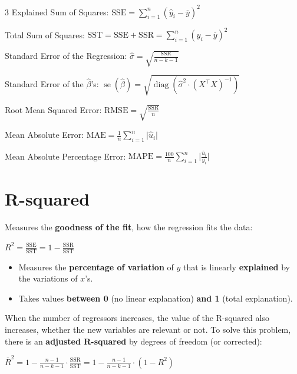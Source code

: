 \documentclass[10pt, a4paper, landscape]{article}
\DeclareMathOperator{\se}{se}
\DeclareMathOperator{\diag}{diag}
\newcommand{\SSR}{\text{SSR}}
\newcommand{\SSE}{\text{SSE}}
\newcommand{\SST}{\text{SST}}
\begin{document}
\begin{multicols}{3}
Explained Sum of Squares: \hfill \( \SSE = \sum_{i = 1}^{n} (\hat{y}_{i} - \overline{y})^{2} \)

Total Sum of Squares: \hfill \( \SST = \SSE + \SSR = \sum_{i = 1}^{n} (y_{i} - \overline{y})^{2} \)

Standard Error of the Regression: \hfill \( \hat{\sigma} = \sqrt{\frac{\SSR}{n - k - 1}} \)

Standard Error of the \( \hat{\beta} \)'s: \hfill \( \se(\hat{\beta}) = \sqrt{ \diag ( \hat{\sigma}^{2} \cdot (X^{\top} X)^{-1} ) } \)

Root Mean Squared Error: \hfill \( \text{RMSE} = \sqrt{\frac{\SSR}{n}} \)

Mean Absolute Error: \hfill \( \text{MAE} = \frac{1}{n} \sum_{i = 1}^{n} \lvert \hat{u}_{i} \rvert \)

Mean Absolute Percentage Error: \hfill \( \text{MAPE} = \frac{100}{n} \sum_{i = 1}^{n} \lvert \frac{\hat{u}_{i}}{y_{i}} \rvert \)

\columnbreak

\section*{R-squared}

Measures the \textbf{goodness of the fit}, how the regression fits the data:

\begin{center}
	\( R^{2} = \frac{\SSE}{\SST} = 1 - \frac{\SSR}{\SST} \)
\end{center}

\begin{itemize}[leftmargin=*]
	\item Measures the \textbf{percentage of variation} of \( y \) that is linearly \textbf{explained} by the variations of \( x \)'s.
	\item Takes values \textbf{between 0} (no linear explanation) \textbf{and 1} (total explanation).
\end{itemize}

When the number of regressors increases, the value of the R-squared also increases, whether the new variables are relevant or not. To solve this problem, there is an \textbf{adjusted R-squared} by degrees of freedom (or corrected):

\begin{center}
	\( \overline{R}^{2} = 1 - \frac{n - 1}{n - k - 1} \cdot \frac{\SSR}{\SST} = 1 - \frac{n - 1}{n - k - 1} \cdot (1 - R^{2}) \)
\end{center}


\end{multicols}
\end{document}
